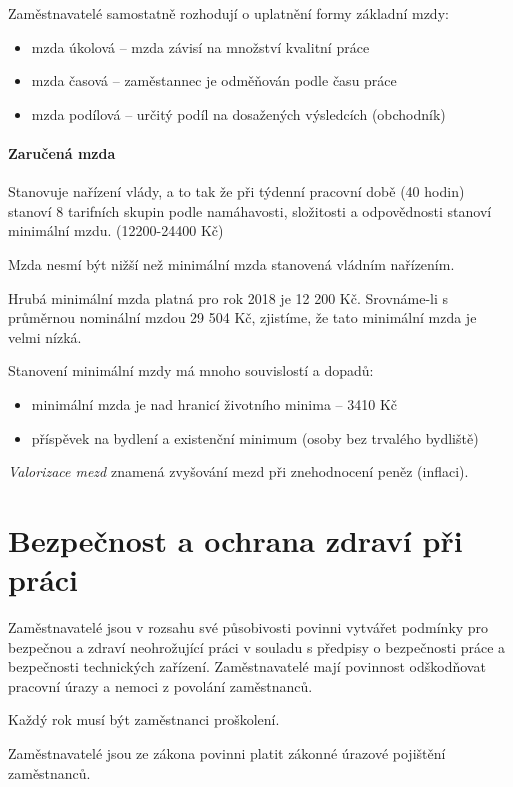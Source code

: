 Zaměstnavatelé samostatně rozhodují o uplatnění formy základní mzdy:
\begin{itemize}
    \item mzda úkolová -- mzda závisí na množství kvalitní práce
    \item mzda časová -- zaměstannec je odměňován podle času práce
    \item mzda podílová -- určitý podíl na dosažených výsledcích (obchodník)
\end{itemize}

\paragraph*{Zaručená mzda}
Stanovuje nařízení vlády, a to tak že při týdenní pracovní době (40 hodin) stanoví 8 tarifních skupin podle namáhavosti, složitosti a odpovědnosti stanoví minimální mzdu. (12200-24400 Kč)

Mzda nesmí být nižší než minimální mzda stanovená vládním nařízením.

Hrubá minimální mzda platná pro rok 2018 je 12 200 Kč. Srovnáme-li s průměrnou nominální mzdou 29 504 Kč, zjistíme, že tato minimální mzda je velmi nízká.

Stanovení minimální mzdy má mnoho souvislostí a dopadů:
\begin{itemize}
    \item minimální mzda je nad hranicí životního minima -- 3410 Kč
    \item příspěvek na bydlení a existenční minimum (osoby bez trvalého bydliště)
\end{itemize}

\emph{Valorizace mezd} znamená zvyšování mezd při znehodnocení peněz (inflaci).

\section*{Bezpečnost a ochrana zdraví při práci}

Zaměstnavatelé jsou v rozsahu své působivosti povinni vytvářet podmínky pro bezpečnou a zdraví neohrožující práci v souladu s předpisy o bezpečnosti práce a bezpečnosti technických zařízení. Zaměstnavatelé mají povinnost odškodňovat pracovní úrazy a nemoci z povolání 	zaměstnanců.

Každý rok musí být zaměstnanci proškolení.

Zaměstnavatelé jsou ze zákona povinni platit zákonné úrazové pojištění zaměstnanců.

